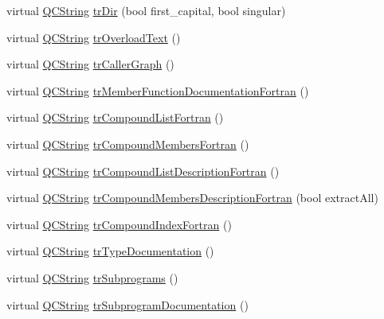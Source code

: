 \begin{DoxyCompactItemize}
\item 
virtual \mbox{\hyperlink{class_q_c_string}{Q\+C\+String}} \mbox{\hyperlink{class_translator_danish_a3e5197e99dcf66474981d186f1b07939}{tr\+Dir}} (bool first\+\_\+capital, bool singular)
\item 
virtual \mbox{\hyperlink{class_q_c_string}{Q\+C\+String}} \mbox{\hyperlink{class_translator_danish_a610a64a8aaec8ff73acaf6c42c98433b}{tr\+Overload\+Text}} ()
\item 
virtual \mbox{\hyperlink{class_q_c_string}{Q\+C\+String}} \mbox{\hyperlink{class_translator_danish_a8e70ce804e5afc7eac9391edd2668f1f}{tr\+Caller\+Graph}} ()
\item 
virtual \mbox{\hyperlink{class_q_c_string}{Q\+C\+String}} \mbox{\hyperlink{class_translator_danish_ad261e64c39e5ba47c0100db4b88bb88a}{tr\+Member\+Function\+Documentation\+Fortran}} ()
\item 
virtual \mbox{\hyperlink{class_q_c_string}{Q\+C\+String}} \mbox{\hyperlink{class_translator_danish_a447b042d5c8092fe9458fbba01eda814}{tr\+Compound\+List\+Fortran}} ()
\item 
virtual \mbox{\hyperlink{class_q_c_string}{Q\+C\+String}} \mbox{\hyperlink{class_translator_danish_add31f1de5778df55b717465844a6dea1}{tr\+Compound\+Members\+Fortran}} ()
\item 
virtual \mbox{\hyperlink{class_q_c_string}{Q\+C\+String}} \mbox{\hyperlink{class_translator_danish_a3f278f32e828bde2cce5380bbe560f66}{tr\+Compound\+List\+Description\+Fortran}} ()
\item 
virtual \mbox{\hyperlink{class_q_c_string}{Q\+C\+String}} \mbox{\hyperlink{class_translator_danish_ac672f73b85740797aabac6b958c83a53}{tr\+Compound\+Members\+Description\+Fortran}} (bool extract\+All)
\item 
virtual \mbox{\hyperlink{class_q_c_string}{Q\+C\+String}} \mbox{\hyperlink{class_translator_danish_a485989c469752296a1aa78db10db3603}{tr\+Compound\+Index\+Fortran}} ()
\item 
virtual \mbox{\hyperlink{class_q_c_string}{Q\+C\+String}} \mbox{\hyperlink{class_translator_danish_aa34f4dd28e9913527eb3c9f19faadd7e}{tr\+Type\+Documentation}} ()
\item 
virtual \mbox{\hyperlink{class_q_c_string}{Q\+C\+String}} \mbox{\hyperlink{class_translator_danish_a351a750f1abe7133a5a674e46ac9dc45}{tr\+Subprograms}} ()
\item 
virtual \mbox{\hyperlink{class_q_c_string}{Q\+C\+String}} \mbox{\hyperlink{class_translator_danish_ab47e9988928a8e3900226c7abf06e0a8}{tr\+Subprogram\+Documentation}} ()

\end{DoxyCompactItemize}
